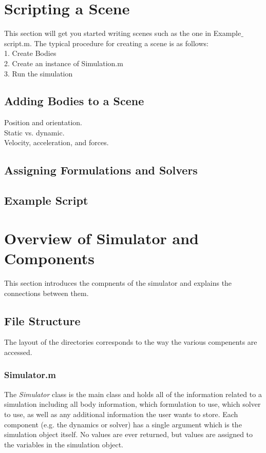 \documentclass{article}
\newcommand{\tab}{\hspace*{2em}}
\begin{document}
\section{Scripting a Scene}
\label{sec:scripting}

This section will get you started writing scenes such as the one in Example$\_$script.m.  The typical procedure for creating a scene is as follows: \\
\tab 1. Create Bodies  \\
\tab 2. Create an instance of Simulation.m \\
\tab 3. Run the simulation

\subsection{Adding Bodies to a Scene}
Position and orientation. \\
Static vs. dynamic. \\
Velocity, acceleration, and forces. \\

\subsection{Assigning Formulations and Solvers}
\subsection{Example Script}


\section{Overview of Simulator and Components}
This section introduces the compnents of the simulator and explains the connections between them.

\subsection{File Structure}
The layout of the directories corresponds to the way the various compenents are accessed. 
\subsubsection{Simulator.m}   
The \emph{Simulator} class is the main class and holds all of the information related to a simulation including all body information, which formulation to use, which solver to use, as well as any additional information the user wants to store.  Each component (e.g. the dynamics or solver) has a single argument which is the simulation object itself.  No values are ever returned, but values are assigned to the variables in the simulation object.  
\end{document}
